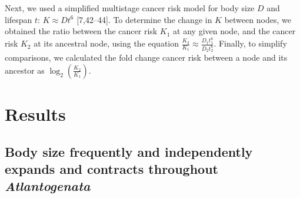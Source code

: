 \documentclass[]{elsarticle} %
\begin{document}
Next, we used a simplified multistage cancer risk model for body size
\(D\) and lifespan \(t\): \(K \approx Dt^6\) {[}7,42--44{]}. To
determine the change in \(K\) between nodes, we obtained the ratio
between the cancer risk \(K_{1}\) at any given node, and the cancer risk
\(K_{2}\) at its ancestral node, using the equation
\(\frac{K_{2}}{K_{1}} \approx \frac{D_{1}t_{1}^6}{D_{2}t_{2}^6}\).
Finally, to simplify comparisons, we calculated the fold change cancer
risk between a node and its ancestor as
\(\log_{2}(\frac{K_{2}}{K_{1}})\).

\hypertarget{results}{%
\section{Results}\label{results}}

\hypertarget{body-size-frequently-and-independently-expands-and-contracts-throughout-atlantogenata}{%
\subsection{\texorpdfstring{Body size frequently and independently
expands and contracts throughout
\emph{Atlantogenata}}{Body size frequently and independently expands and contracts throughout Atlantogenata}}\label{body-size-frequently-and-independently-expands-and-contracts-throughout-atlantogenata}}
\end{document}
